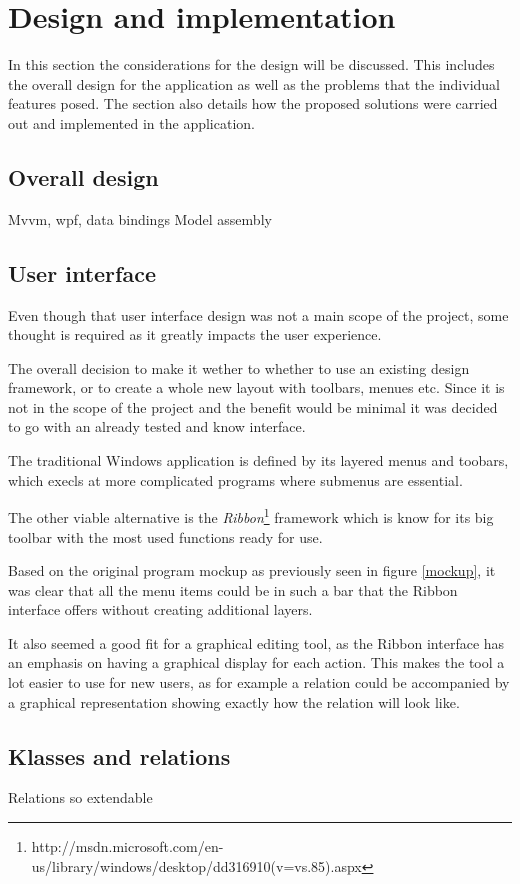 \section{Design and implementation}
In this section the considerations for the design will be discussed. This
includes the overall design for the application as well as the problems that the
individual features posed. The section also details how the proposed solutions
were carried out and implemented in the application.

\subsection{Overall design}
Mvvm, wpf, data bindings
Model assembly
\subsection{User interface}
Even though that user interface design was not a main scope of the project, some
thought is required as it greatly impacts the user experience. 

The overall decision to make it wether to whether to use an existing design
framework, or to create a whole new layout with toolbars, menues etc. Since it
is not in the scope of the project and the benefit would be minimal it was decided
to go with an already tested and know interface. 

The traditional Windows application is defined by its layered menus and
toobars,
which execls at more complicated programs where submenus are essential.

The other viable alternative is the \textit{Ribbon}\footnote{http://msdn.microsoft.com/en-us/library/windows/desktop/dd316910(v=vs.85).aspx} framework which is know for
its big toolbar with the most used functions ready for use.

Based on the original program mockup as previously seen in figure \ref{mockup},
it was clear that all the menu items could be in such a bar that the Ribbon
interface offers without creating additional layers.

It also seemed a good fit for a graphical editing tool, as the Ribbon interface
has an emphasis on having a graphical display for each action. This makes the
tool a lot easier to use for new users, as for example a relation could be
accompanied by a graphical representation showing exactly how the relation will
look like.

\subsection{Klasses and relations}
Relations so extendable

